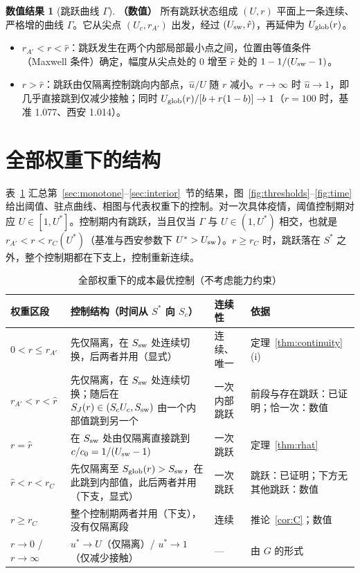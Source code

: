\documentclass[11pt,a4paper]{ctexart}
\theoremstyle{definition}
\theoremstyle{definition}
\newtheorem{numres}[theorem]{数值结果}
\newcommand{\Usw}{U_{\rm sw}}
\newcommand{\Ssw}{S_{\rm sw}}
\newcommand{\rA}{r_{A'}}
\newcommand{\rhat}{\hat r}
\newcommand{\Uglob}{U_{\rm glob}}
\newcommand{\numer}{\textbf{（数值）}}
\begin{document}
\begin{numres}[跳跃曲线 $\Gamma$]\label{num:gamma}\numer
所有跳跃状态组成 $(U,r)$ 平面上一条连续、严格增的曲线 $\Gamma$。它从尖点 $(U_c,\rA)$ 出发，经过 $(\Usw,\rhat)$，再延伸为 $\Uglob(r)$。
\begin{itemize}
\item $\rA<r<\rhat$：跳跃发生在两个内部局部最小点之间，位置由等值条件（Maxwell 条件）确定，幅度从尖点处的 $0$ 增至 $\rhat$ 处的 $1-1/(\Usw-1)$。
\item $r>\rhat$：跳跃由仅隔离控制跳向内部点，$\hat u/U$ 随 $r$ 减小。$r\to\infty$ 时 $\hat u\to1$，即几乎直接跳到仅减少接触；同时 $\Uglob(r)/[b+r(1-b)]\to1$（$r=100$ 时，基准 1.077、西安 1.014）。
\end{itemize}
\end{numres}

\section{全部权重下的结构}
\label{sec:summary}

表~\ref{tab:regimes} 汇总第~\ref{sec:monotone}--\ref{sec:interior}~节的结果，图~\ref{fig:thresholds}--\ref{fig:time} 给出阈值、驻点曲线、相图与代表权重下的控制。对一次具体疫情，阈值控制期对应 $U\in[1,U^*]$。控制期内有跳跃，当且仅当 $\Gamma$ 与 $U\in(1,U^*)$ 相交，也就是 $\rA<r<r_C(U^*)$（基准与西安参数下 $U^*>\Usw$）。$r\ge r_C$ 时，跳跃落在 $S^*$ 之外，整个控制期都在下支上，控制重新连续。

\begin{table}[htbp]\centering\small
\caption{全部权重下的成本最优控制（不考虑能力约束）}\label{tab:regimes}
\begin{tabular}{@{}p{2.3cm}p{6.6cm}p{2.0cm}p{3.0cm}@{}}\toprule
权重区段 & 控制结构（时间从 $S^*$ 向 $S_c$） & 连续性 & 依据\\\midrule
$0<r\le\rA$ & 先仅隔离，在 $\Ssw$ 处连续切换，后两者并用（显式） & 连续、唯一 & 定理~\ref{thm:continuity}(i)\\
$\rA<r<\rhat$ & 先仅隔离，在 $\Ssw$ 处连续切换；随后在 $S_J(r)\in(S_cU_c,\Ssw)$ 由一个内部值跳到另一个 & 一次内部跳跃 & 前段与存在跳跃：已证明；恰一次：数值\\
$r=\rhat$ & 在 $\Ssw$ 处由仅隔离直接跳到 $c/c_0=1/(\Usw-1)$ & 一次跳跃 & 定理~\ref{thm:rhat}\\
$\rhat<r<r_C$ & 先仅隔离至 $S_{\rm glob}(r)>\Ssw$，在此跳到内部值，此后两者并用（下支，显式） & 一次跳跃 & 跳跃：已证明；下方无其他跳跃：数值\\
$r\ge r_C$ & 整个控制期两者并用（下支），没有仅隔离段 & 连续 & 推论~\ref{cor:C}；数值\\
$r\to0$ / $r\to\infty$ & $u^*\to U$（仅隔离）/ $u^*\to1$（仅减少接触） & — & 由 $G$ 的形式\\\bottomrule
\end{tabular}
\end{table}
\end{document}
